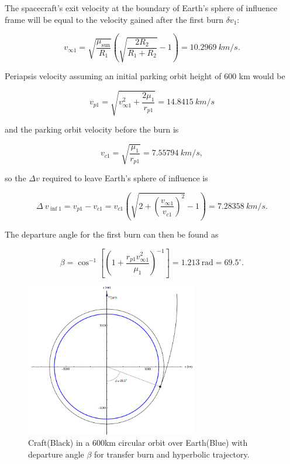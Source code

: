 \documentclass[conf]{new-aiaa}
\begin{document}
The spacecraft's exit velocity at the boundary of Earth's sphere of influence frame will be equal to the velocity gained after the first burn $\delta v_1$:

\begin{equation}
v_{\infty 1}=\sqrt{\frac{\mu_{\text{sun}}}{R_ 1}}(\sqrt{\frac{2R_2}{R_ 1 +R_ 2}}-1) = 10.2969 \ km/s.
\end{equation}

Periapsis velocity assuming an initial parking orbit height of 600 km would be

\begin{equation}
v_{p1} =\sqrt{v_ {\infty 1}^2 + \frac{2\mu_1}{r_{p1}}} = 14.8415 \ km/s
\end{equation}

and the parking orbit velocity before the burn is

\begin{equation}
v_{c1} = \sqrt{\frac{\mu_{1}}{r_{p1}}} = 7.55794 \ km/s,
\end{equation}

so the $\Delta v$ required to leave Earth's sphere of influence is

\begin{equation}
\Delta \!\ v_{\inf 1} = v_{p1} - v_{c1} = v_{c1} (\sqrt{2+(\frac{v_{\infty 1}}{v_{c1}})^2}-1) = 7.28358 \ km/s.
\end{equation}

The departure angle for the first burn can then be found as

\begin{equation}
\beta = \cos^{-1}[(1+\frac{r_{p1} v_ {\infty 1}^2}{\mu_1})^{-1}] = 1.213 \ \text {rad} = 69.5^{\circ}.
\end{equation}

\begin{figure}[htp]
    \centering
    \includegraphics[width=7.5cm]{Project Figure 2.png}
    \caption{Craft(Black) in a 600km circular orbit over Earth(Blue) with departure angle $\beta$ for transfer burn and hyperbolic trajectory.}
\end{figure}
\end{document}
